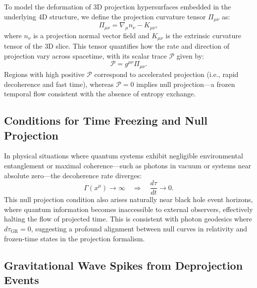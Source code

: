 \documentclass[12pt,a4paper]{article}
\numberwithin{equation}{section}
\begin{document}
To model the deformation of 3D projection hypersurfaces embedded in the underlying 4D structure, we define the projection curvature tensor $\Pi_{\mu\nu}$ as:
\begin{equation}
\label{eq:proj_curv_tensor}
\Pi_{\mu\nu} = \nabla_\mu n_\nu - K_{\mu\nu},
\end{equation}
where $n_\nu$ is a projection normal vector field and $K_{\mu\nu}$ is the extrinsic curvature tensor of the 3D slice. This tensor quantifies how the rate and direction of projection vary across spacetime, with its scalar trace $\mathcal{P}$ given by:
\begin{equation}
\label{eq:proj_curv_scalar}
\mathcal{P} = g^{\mu\nu} \Pi_{\mu\nu}.
\end{equation}
Regions with high positive $\mathcal{P}$ correspond to accelerated projection (i.e., rapid decoherence and fast time), whereas $\mathcal{P} = 0$ implies null projection—a frozen temporal flow consistent with the absence of entropy exchange.

\subsection{Conditions for Time Freezing and Null Projection}

In physical situations where quantum systems exhibit negligible environmental entanglement or maximal coherence—such as photons in vacuum or systems near absolute zero—the decoherence rate diverges:
\begin{equation}
\label{eq:time_freeze}
\Gamma(x^\mu) \rightarrow \infty \quad \Rightarrow \quad \frac{d\tau}{dt} \rightarrow 0.
\end{equation}
This null projection condition also arises naturally near black hole event horizons, where quantum information becomes inaccessible to external observers, effectively halting the flow of projected time. This is consistent with photon geodesics where $d\tau_{\text{GR}} = 0$, suggesting a profound alignment between null curves in relativity and frozen-time states in the projection formalism.

\subsection{Gravitational Wave Spikes from Deprojection Events}
\end{document}
